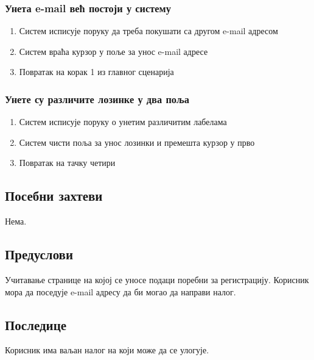 \subsubsection{Унета e-mail већ постоји у систему}
\begin{enumerate}[label=2.\arabic*]
    \item Систем исписује поруку да треба покушати са другом e-mail адресом
    \item Систем враћа курзор у поље за унос e-mail адресе
    \item Повратак на корак 1 из главног сценарија
\end{enumerate}

\subsubsection{Унете су различите лозинке у два поља}
\begin{enumerate}[label=6.\arabic*]
    \item Систем исписује поруку о унетим различитим лабелама
    \item Систем чисти поља за унос лозинки и премешта курзор у прво
    \item Повратак на тачку четири
\end{enumerate}

\subsection{Посебни захтеви}
Нема.

\subsection{Предуслови}
Учитавање странице на којој се уносе подаци поребни за регистрацију.
Корисник мора да поседује e-mail адресу да би могао да направи налог.

\subsection{Последице}
Корисник има ваљан налог на који може да се улогује. 
